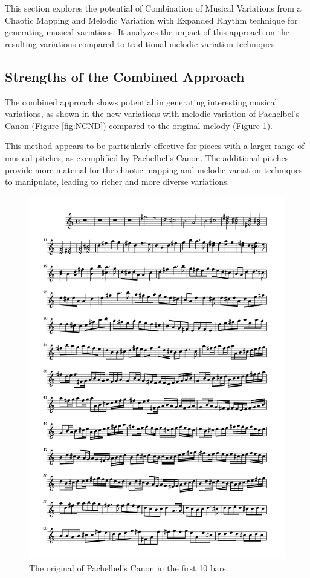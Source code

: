 \documentclass[11pt]{article}
\theoremstyle{definition}
\begin{document}
This section explores the potential of Combination of Musical Variations from a Chaotic Mapping and Melodic Variation with Expanded Rhythm technique for generating musical variations. It analyzes the impact of this approach on the resulting variations compared to traditional melodic variation techniques. 

\subsection{Strengths of the Combined Approach}

The combined approach shows potential in generating interesting musical variations, as shown in the new variations with melodic variation of Pachelbel's Canon \cite{pachelbel_canon_2005} (Figure \ref{fig:NCND}) compared to the original melody (Figure \ref{fig:OCND}).

This method appears to be particularly effective for pieces with a larger range of musical pitches, as exemplified by Pachelbel's Canon. The additional pitches provide more material for the chaotic mapping and melodic variation techniques to manipulate, leading to richer and more diverse variations.

\begin{figure}
\centering
\includegraphics[trim=1cm 26.5cm 1cm 0.5cm, clip, scale=0.6]{Original_CND.pdf}
\caption{The original of Pachelbel's Canon in the first 10 bars.} 
\label{fig:OCND}
\end{figure}
\end{document}
